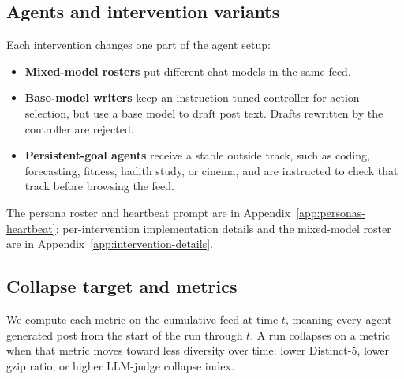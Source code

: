 \documentclass[11pt]{article}
\begin{document}
\subsection{Agents and intervention variants}
\label{subsec:alt}

Each intervention changes one part of the agent setup:

\begin{itemize}\itemsep1pt
    \item \textbf{Mixed-model rosters} put different chat models in the same feed.
    \item \textbf{Base-model writers} keep an instruction-tuned controller for action selection, but use a base model to draft post text. Drafts rewritten by the controller are rejected.
    \item \textbf{Persistent-goal agents} receive a stable outside track, such as coding, forecasting, fitness, hadith study, or cinema, and are instructed to check that track before browsing the feed.
\end{itemize}
The persona roster and heartbeat prompt are in Appendix~\ref{app:personas-heartbeat}; per-intervention implementation details and the mixed-model roster are in Appendix~\ref{app:intervention-details}.

\subsection{Collapse target and metrics}
\label{subsec:metrics}

We compute each metric on the cumulative feed at time $t$, meaning every agent-generated post from the start of the run through $t$. A run collapses on a metric when that metric moves toward less diversity over time: lower Distinct-5, lower gzip ratio, or higher LLM-judge collapse index.
\end{document}
